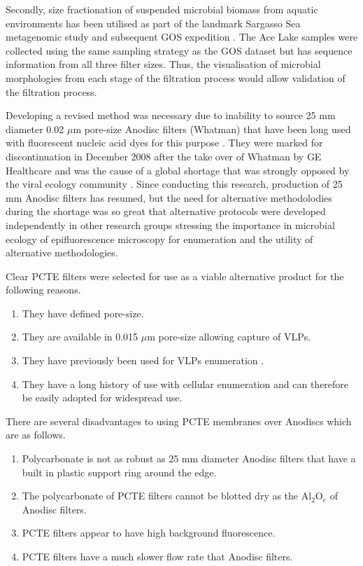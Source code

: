 Secondly, size fractionation of suspended microbial biomass from aquatic environments has been utilised as part of the landmark Sargasso Sea metagenomic study \cite{Venter2004} and subsequent \ac{GOS} expedition \cite{Rusch2007}.
The Ace Lake samples were collected using the same sampling strategy as the \ac{GOS} dataset but has sequence information from all three filter sizes. 
Thus, the visualisation of microbial morphologies from each stage of the filtration process would allow validation of the filtration process.

Developing a revised method was necessary due to inability to source 25 mm diameter 0.02 $\mu$m pore-size Anodisc filters (Whatman) that have been long used with fluorescent nucleic acid dyes for this purpose \cite{Hennes1995, Noble1998}. 
They were marked for discontinuation in December 2008 after the take over of Whatman by GE Healthcare and was the cause of a global shortage that was strongly opposed by the viral ecology community \cite{Torrice2009}.
Since conducting this research, production of 25 mm Anodisc filters has resumed, but the need for alternative methodolodies during the shortage was so great that alternative protocols were developed independently in other research groups \cite{Budinoff2011,Diemer2012} stressing the importance in microbial ecology of epifluorescence microscopy for enumeration and the utility of alternative methodologies.

Clear \ac{PCTE} filters were selected for use as a viable alternative product for the following reasons. 
\begin{enumerate}
\item They have defined pore-size. %
\item They are available in 0.015 $\mu$m pore-size allowing capture of \acp{VLP}.
\item They have previously been used for \acp{VLP} enumeration \cite{Hara1991,Proctor1992}.
\item They have a long history of use with cellular enumeration \cite{Hobbie1977} and can therefore be easily adopted for widespread use.
\end{enumerate}


There are several disadvantages to using \ac{PCTE} membranes over Anodiscs which are as follows.
\begin{enumerate}
\item Polycarbonate is not as robust as 25 mm diameter Anodisc filters that have a built in plastic support ring around the edge.
\item The polycarbonate of \ac{PCTE} filters cannot be blotted dry as the Al$_{2}$O$_{e}$ of Anodisc filters.
\item \ac{PCTE} filters appear to have high background fluorescence. %
\item \ac{PCTE} filters have a much slower flow rate that Anodisc filters. %
\end{enumerate}

